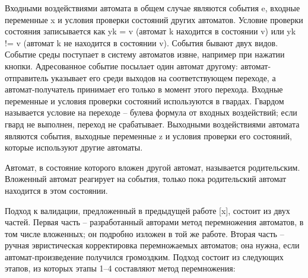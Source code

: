 \documentclass[12pt]{article}
\begin{document}
Входными воздействиями автомата в общем случае являются события e, входные переменные x и условия проверки состояний других автоматов. Условие проверки состояния записывается как yk = v (автомат k находится в состоянии v) или yk != v (автомат k не находится в состоянии v). События бывают двух видов. Событие среды поступает в систему автоматов извне, например при нажатии кнопки. Адресованное событие посылает один автомат другому: автомат-отправитель указывает его среди выходов на соответствующем переходе, а автомат-получатель принимает его только в момент этого перехода. Входные переменные и условия проверки состояний используются в гвардах. Гвардом называется условие на переходе – булева формула от входных воздействий; если гвард не выполнен, переход не срабатывает. Выходными воздействиями автомата являются события, выходные переменные z и условия проверки его состояний, которые используют другие автоматы.

Автомат, в состояние которого вложен другой автомат, называется родительским. Вложенный автомат реагирует на события, только пока родительский автомат находится в этом состоянии.

Подход к валидации, предложенный в предыдущей работе [x], состоит из двух частей. Первая часть – разработанный авторами метод перемножения автоматов, в том числе вложенных; он подробно изложен в той же работе. Вторая часть – ручная эвристическая корректировка перемножаемых автоматов; она нужна, если автомат-произведение получился громоздким. Подход состоит из следующих этапов, из которых этапы 1–4 составляют метод перемножения:
\end{document}
